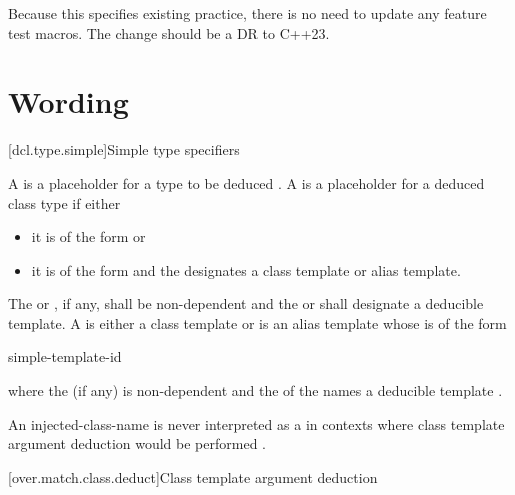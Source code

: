 \documentclass{wg21}
\begin{document}
Because this specifies existing practice, there is no need to update any feature test macros. The change should be a DR to C++23.

\section{Wording}

[dcl.type.simple]{Simple type specifiers}%

A 
is a placeholder for
a type to be deduced .
%
A  is a placeholder for
a deduced class type  if either
\begin{itemize}
    \item
    it is of the form
       or
    \item
    it is of the form   and
    the  designates
    a class template or alias template.
\end{itemize}
The  or ,
if any, shall be non-dependent and
the  or 
shall designate a deducible template.
A  is either a class template or
is an alias template whose  is of the form

\begin{ncsimplebnf}
       simple-template-id
\end{ncsimplebnf}

where the  (if any) is non-dependent and
the  of the 
names a deducible template .
\begin{note}
    An injected-class-name is never interpreted as a 
    in contexts where class template argument deduction would be performed .
\end{note}


[over.match.class.deduct]{Class template argument deduction}%
%
\end{document}
